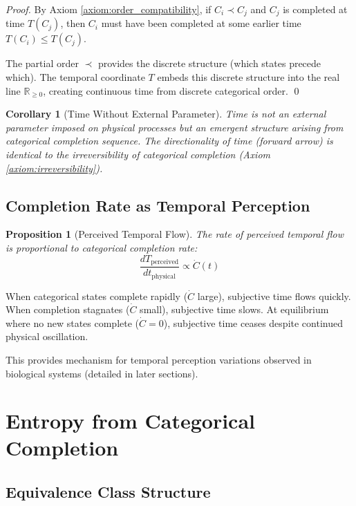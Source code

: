 \documentclass[12pt,a4paper]{article}
\newtheorem{corollary}{Corollary}
\newtheorem{proposition}{Proposition}
\begin{document}
\begin{proof}
By Axiom \ref{axiom:order_compatibility}, if $C_i \prec C_j$ and $C_j$ is completed at time $T(C_j)$, then $C_i$ must have been completed at some earlier time $T(C_i) \leq T(C_j)$.

The partial order $\prec$ provides the discrete structure (which states precede which). The temporal coordinate $T$ embeds this discrete structure into the real line $\mathbb{R}_{\geq 0}$, creating continuous time from discrete categorical order. \qed
\end{proof}

\begin{corollary}[Time Without External Parameter]
Time is not an external parameter imposed on physical processes but an emergent structure arising from categorical completion sequence. The directionality of time (forward arrow) is identical to the irreversibility of categorical completion (Axiom \ref{axiom:irreversibility}).
\end{corollary}

\subsection{Completion Rate as Temporal Perception}

\begin{proposition}[Perceived Temporal Flow]
\label{prop:temporal_flow}
The rate of perceived temporal flow is proportional to categorical completion rate:
\begin{equation}
\frac{dT_{\text{perceived}}}{dt_{\text{physical}}} \propto \dot{C}(t)
\end{equation}
\end{proposition}

When categorical states complete rapidly ($\dot{C}$ large), subjective time flows quickly. When completion stagnates ($\dot{C}$ small), subjective time slows. At equilibrium where no new states complete ($\dot{C} = 0$), subjective time ceases despite continued physical oscillation.

This provides mechanism for temporal perception variations observed in biological systems (detailed in later sections).

\section{Entropy from Categorical Completion}

\subsection{Equivalence Class Structure}
\end{document}
